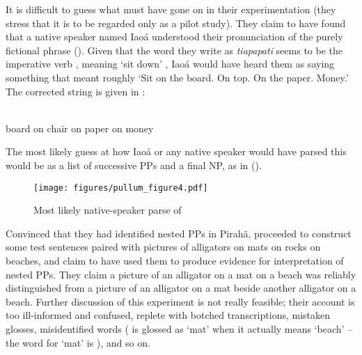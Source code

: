\documentclass[output=paper,colorlinks,citecolor=brown
]{langscibook}
\begin{document}
It is difficult to guess what must have gone on in their experimentation
(they stress that it is to be regarded only as a pilot study). They claim
to have found that a native speaker named Iaoá understood their
pronunciation of the purely fictional phrase (). Given that the word
they write as \textit{tiapapati} seems to be the imperative verb
, meaning `sit down'
\citep[786--787]{EverGibs19}, Iaoá would have heard them as
saying something that meant roughly `Sit on the board. On top. On
the paper. Money.' The corrected string is given in :

\ea
\label{ex:pullum:7}
\gll {}  
      \\
    board on chair on paper on money \\
\z

The most likely guess at how Iaoá or any native speaker would
have parsed this would be as a list of successive PPs and a final NP,
as in ().

\begin{figure}
\texttt{[image: figures/pullum\_figure4.pdf]}
 \caption{Most likely native-speaker parse of }
 \label{fig:pullum:3}
\end{figure}

Convinced that they had identified nested PPs in Pirahã, \citet[289--292]{SandaloEtAl18} proceeded to construct some
test sentences paired with pictures of alligators on mats on rocks on
beaches, and claim to have used them to produce evidence for
interpretation of nested PPs. They claim a picture of an alligator on
a mat on a beach was reliably distinguished from a picture of an
alligator on a mat beside another alligator on a beach. Further
discussion of this experiment is not really feasible; their account is
too ill-informed and confused, replete with botched transcriptions,
mistaken glosses, misidentified words ( is glossed as
`mat' when it actually means `beach' -- the word for `mat' is
), and so on.
\end{document}
